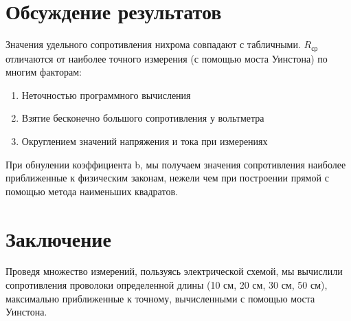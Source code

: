 \documentclass[a4paper, 12pt]{article}
\begin{document}
\section {Обсуждение результатов} 
    Значения удельного сопротивления нихрома совпадают с табличными. $R_{ср}$ отличаются от наиболее точного измерения (с помощью моста Уинстона) по многим факторам: 
    \begin{enumerate}
        \item Неточностью программного вычисления
        \item Взятие бесконечно большого сопротивления у вольтметра 
        \item Округлением значений напряжения и тока при измерениях 
    \end{enumerate}

    При обнулении коэффициента b, мы получаем значения сопротивления наиболее приближенные к физическим законам, нежели чем при построении прямой с помощью метода наименьших квадратов.  

\section {Заключение}
    Проведя множество измерений, пользуясь электрической схемой, мы вычислили сопротивления проволоки определенной длины (10 см, 20 см, 30 см, 50 см), максимально приближенные к точному, вычисленными с помощью моста Уинстона.   
\end{document}
